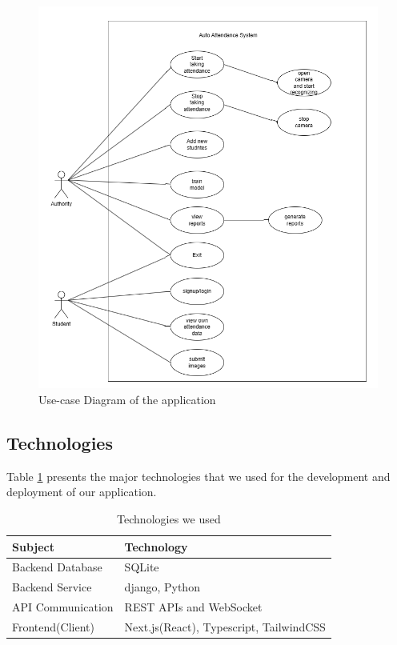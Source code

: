 \begin{figure}[H]
    \includegraphics[width=\linewidth]{figures/use-case.png}
    \centering
    \caption{Use-case Diagram of the application}
    \label{fig:usecase}
\end{figure}

\subsection{Technologies}
Table \ref{table:tech} presents the major technologies that we used for the development and deployment of our application.

\renewcommand{\arraystretch}{1.5}
\begin{table}[H]
\centering
    \begin{tabular}{|l|l|}
        \hline
        \textbf{Subject}    & \textbf{Technology} \\ \hline
        Backend Database            &SQLite           \\ \hline
        Backend Service    & django, Python        \\ \hline
        API Communication & REST APIs and WebSocket \\ \hline
        Frontend(Client)  & Next.js(React), Typescript, TailwindCSS              \\ \hline
    \end{tabular}
    \caption{Technologies we used}
    \label{table:tech}
\end{table}

